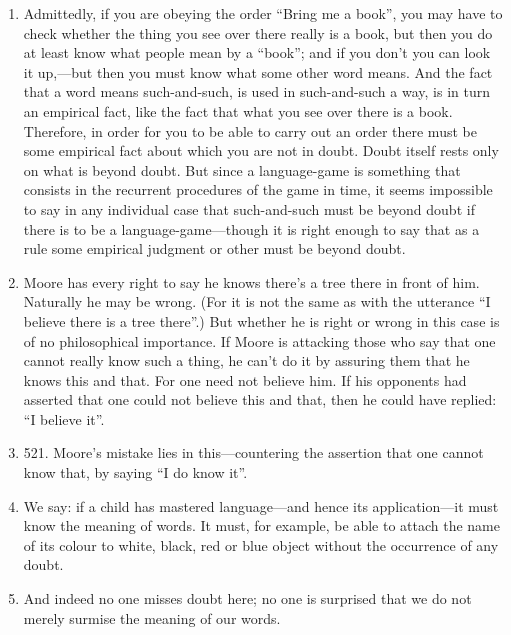 \documentclass{book}
\begin{document}
\begin{enumerate}
\item
Admittedly, if you are obeying the order ``Bring me a book'', you may have to
check whether the thing you see over there really is a book, but then you do at
least know what people mean by a ``book''; and if you don't you can look it
up,---but then you must know what some other word means. And the fact that a
word means such-and-such, is used in such-and-such a way, is in turn an
empirical fact, like the fact that what you see over there is a book.
Therefore, in order for you to be able to carry out an order there must be some
empirical fact about which you are not in doubt. Doubt itself rests only on
what is beyond doubt.  But since a language-game is something that consists in
the recurrent procedures of the game in time, it seems impossible to say in any
individual case that such-and-such must be beyond doubt if there is to be a
language-game---though it is right enough to say that as a rule some empirical
judgment or other must be beyond doubt.

\item
Moore has every right to say he knows there's a tree there in front of him.
Naturally he may be wrong. (For it is not the same as with the utterance ``I
believe there is a tree there''.) But whether he is right or wrong in this case
is of no philosophical importance. If Moore is attacking those who say that one
cannot really know such a thing, he can't do it by assuring them that he knows
this and that. For one need not believe him. If his opponents had asserted that
one could not believe this and that, then he could have replied: ``I believe
it''.

\item

521.
Moore's mistake lies in this---countering the assertion that one cannot know
that, by saying ``I do know it''.

\item
We say: if a child has mastered language---and hence its application---it must
know the meaning of words. It must, for example, be able to attach the name of
its colour to white, black, red or blue object without the occurrence of any
doubt.

\item
And indeed no one misses doubt here; no one is surprised that we do not merely
surmise the meaning of our words.


\end{enumerate}
\end{document}
